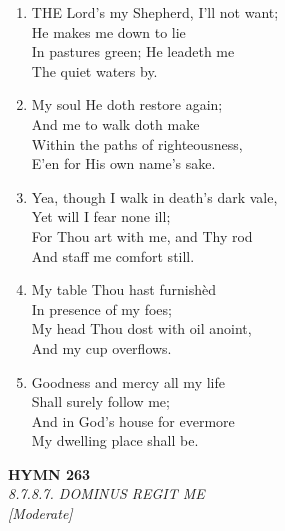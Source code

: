 \documentclass[11pt,a4paper]{article}
\begin{document}
\begin{enumerate}
    \item THE Lord's my Shepherd, I'll not want; \\
            He makes me down to lie \\
        In pastures green; He leadeth me \\
            The quiet waters by.

    \item My soul He doth restore again; \\
            And me to walk doth make \\
        Within the paths of righteousness, \\
            E'en for His own name's sake.

    \item Yea, though I walk in death's dark vale, \\
            Yet will I fear none ill; \\
        For Thou art with me, and Thy rod \\
            And staff me comfort still.

    \item My table Thou hast furnish\`ed \\
            In presence of my foes; \\
        My head Thou dost with oil anoint, \\
            And my cup overflows.

    \item Goodness and mercy all my life \\
            Shall surely follow me; \\
        And in God's house for evermore \\
            My dwelling place shall be.

\end{enumerate}

\newpage
\begin{center}
    {\Large \textbf{HYMN 263}}
    \\
    \textit{8.7.8.7. DOMINUS REGIT ME}
    \\
    \textit{\small [Moderate]}
\end{center}
\vspace{1em}
\end{document}
